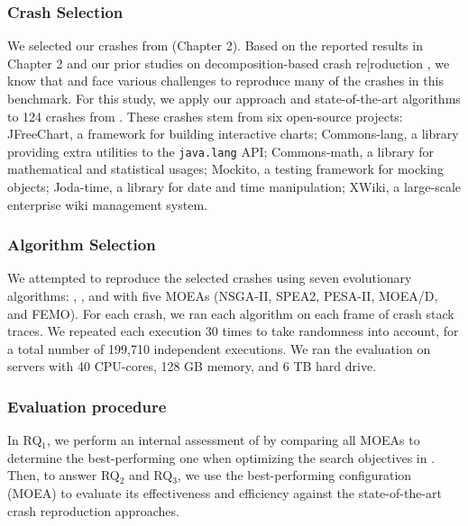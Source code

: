 \subsubsection{Crash Selection} 
We selected our crashes from \crashpack (Chapter 2). 
Based on the reported results in Chapter 2 and our prior studies on decomposition-based crash re[roduction \cite{Soltani2018b}, we know that \SGGA and \decomposition face various challenges to reproduce many of the crashes in this benchmark. For this study, we apply our approach and state-of-the-art algorithms to 124 crashes from \crashpack. These crashes stem from six open-source projects: \textrm{JFreeChart}, a framework for building interactive charts; \textrm{Commons-lang}, a library providing extra utilities to the \texttt{java.lang} API; \textrm{Commons-math}, a library for mathematical and statistical usages; \textrm{Mockito}, a testing framework for mocking objects;
\textrm{Joda-time}, a library for date and time manipulation; XWiki, a large-scale enterprise wiki management system.


\subsubsection{Algorithm Selection}
We attempted to reproduce the selected crashes using seven evolutionary algorithms: \SGGA, \decomposition,
and \moho with  five MOEAs (NSGA-II, SPEA2, PESA-II, MOEA/D, and FEMO). 
For each crash, we ran each algorithm on each frame of crash stack traces. We repeated each execution 30 times to take randomness into account, for a total number of 199,710 independent executions.
We ran the evaluation on servers with 40 CPU-cores, 128 GB memory, and 6 TB hard drive.

\subsubsection{Evaluation procedure}
In RQ$_1$, %
we perform an internal assessment of \moho by comparing all MOEAs to determine the best-performing one when optimizing the search objectives in \moho. Then, to answer RQ$_2$ and RQ$_3$, we use the best-performing \moho configuration (MOEA) to evaluate its effectiveness and efficiency against the state-of-the-art crash reproduction approaches. 

